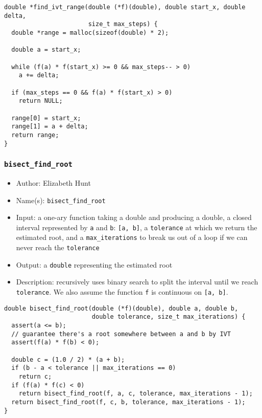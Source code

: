 \documentclass[11pt]{article}
\begin{document}
\begin{verbatim}
double *find_ivt_range(double (*f)(double), double start_x, double delta,
                       size_t max_steps) {
  double *range = malloc(sizeof(double) * 2);

  double a = start_x;

  while (f(a) * f(start_x) >= 0 && max_steps-- > 0)
    a += delta;

  if (max_steps == 0 && f(a) * f(start_x) > 0)
    return NULL;

  range[0] = start_x;
  range[1] = a + delta;
  return range;
}
\end{verbatim}
\subsubsection{\texttt{bisect\_find\_root}}
\label{sec:orgb118fc7}
\begin{itemize}
\item Author: Elizabeth Hunt
\item Name(s): \texttt{bisect\_find\_root}
\item Input: a one-ary function taking a double and producing a double, a closed interval represented
by \texttt{a} and \texttt{b}: \texttt{[a, b]}, a \texttt{tolerance} at which we return the estimated root, and a
\texttt{max\_iterations} to break us out of a loop if we can never reach the \texttt{tolerance}
\item Output: a \texttt{double} representing the estimated root
\item Description: recursively uses binary search to split the interval until we reach \texttt{tolerance}. We
also assume the function \texttt{f} is continuous on \texttt{[a, b]}.
\end{itemize}

\begin{verbatim}
double bisect_find_root(double (*f)(double), double a, double b,
                        double tolerance, size_t max_iterations) {
  assert(a <= b);
  // guarantee there's a root somewhere between a and b by IVT
  assert(f(a) * f(b) < 0);

  double c = (1.0 / 2) * (a + b);
  if (b - a < tolerance || max_iterations == 0)
    return c;
  if (f(a) * f(c) < 0)
    return bisect_find_root(f, a, c, tolerance, max_iterations - 1);
  return bisect_find_root(f, c, b, tolerance, max_iterations - 1);
}
\end{verbatim}
\end{document}
